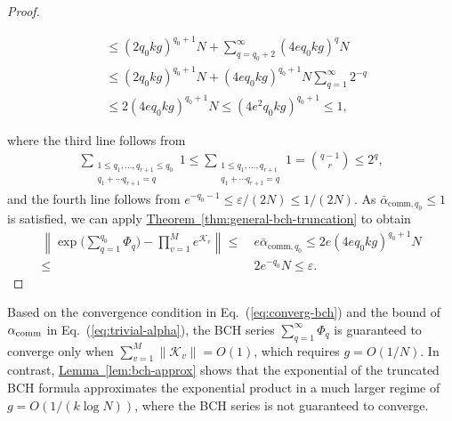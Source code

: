 \documentclass[aps,pra,reprint,groupedaddress,floatfix]{revtex4-2}
\newcommand{\eq}[1]{(\ref{eq:#1})}
\newcommand{\thm}[1]{\hyperref[thm:#1]{Theorem~\ref*{thm:#1}}}
\newcommand{\lem}[1]{\hyperref[lem:#1]{Lemma~\ref*{lem:#1}}}
\renewcommand{\comm}{\mathrm{comm}}
\newcommand{\eps}{\varepsilon}
\newcommand{\mc}{\mathcal}
\begin{document}
\begin{proof}
\begin{widetext}
\begin{align*}
    &\le(2q_0 kg)^{q_0+1} N+  \sum_{q=q_0+2}^{\infty} (4eq_0 kg)^q N   \\
    &\le (2q_0kg)^{q_0+1} N + (4eq_0 kg)^{q_0+1} N \sum_{q = 1}^{\infty} 2^{-q} \\
    &\le 2(4eq_0kg)^{q_0+1}N \le (4e^2q_0 kg)^{q_0+1}\le 1,
    \end{align*}
    \end{widetext}
where the third line follows from 
\begin{align*}
    \sum_{\substack{1\le q_1, \ldots, q_{r+1}\le q_0\\q_1+\cdots q_{r+1}=q}}1\le  \sum_{\substack{1\le q_1, \ldots, q_{r+1}\\q_1+\cdots q_{r+1}=q}}1=\binom{q-1}{r}\le 2^q,
\end{align*}
and the fourth line follows from $e^{-q_0-1} \le \eps/(2N) \le 1/(2N)$.
    As $\bar{\alpha}_{\comm,q_0}\le 1$ is satisfied, we can apply \thm{general-bch-truncation} to obtain 
    \begin{align*}
    \left\|\exp\Big(\sum_{q=1}^{q_0} \Phi_q\Big) - \prod_{v = 1}^Me^{\mc K_v} \right\|
    \le~&   e\bar{\alpha}_{\comm,q_0}\le 2e(4eq_0kg)^{q_0+1}N\\
    \le~&  2e^{-q_0}N\le \eps.
    \end{align*}
\end{proof}
Based on the convergence condition in Eq.~\eq{converg-bch} and the bound of $\alpha_{\rm comm}$ in Eq.~\eq{trivial-alpha}, the BCH series $\sum_{q=1}^{\infty} \Phi_q$ is guaranteed to converge only when $\sum_{v=1}^M \|\mc K_v\| = O(1)$, which requires $g = O(1/N)$. In contrast, \lem{bch-approx}  shows that the exponential of the truncated BCH formula approximates the exponential product in a much larger regime of $g = O(1/(k\log N))$, where the BCH series is not guaranteed to converge. 

\end{document}
